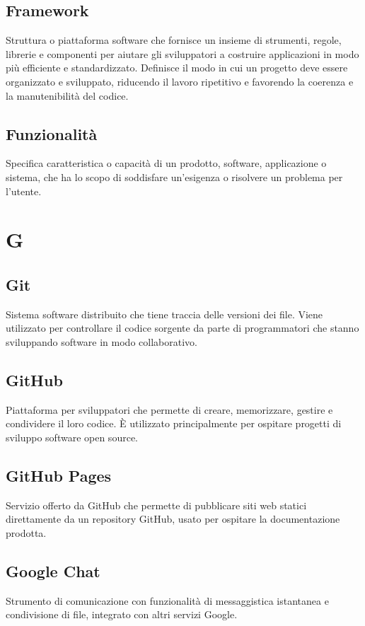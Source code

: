     \subsection{Framework}
    Struttura o piattaforma software che fornisce un insieme di strumenti, regole, 
    librerie e componenti per aiutare gli sviluppatori a costruire applicazioni 
    in modo più efficiente e standardizzato. Definisce il modo in cui un progetto 
    deve essere organizzato e sviluppato, riducendo il lavoro ripetitivo e favorendo 
    la coerenza e la manutenibilità del codice.
    \subsection{Funzionalità}
    \label{Funzionalità}
    Specifica caratteristica o capacità di un prodotto, software, applicazione o sistema, 
    che ha lo scopo di soddisfare un'esigenza o risolvere un problema per l'utente.
\pagebreak
\section{G}
    \subsection{Git}
    \label{Git}
    Sistema software distribuito che tiene traccia delle versioni dei file. 
    Viene utilizzato per controllare il codice sorgente da parte di programmatori 
    che stanno sviluppando software in modo collaborativo.
    \subsection{GitHub}
    \label{GitHub}
    Piattaforma per sviluppatori che permette di creare, memorizzare, gestire 
    e condividere il loro codice. È utilizzato principalmente per ospitare 
    progetti di sviluppo software open source.
    \subsection{GitHub Pages}
    \label{GitHub Pages}
    Servizio offerto da GitHub che permette di pubblicare siti web statici direttamente da un repository GitHub,
    usato per ospitare la documentazione prodotta.
    \subsection{Google Chat}
    Strumento di comunicazione con funzionalità di messaggistica
    istantanea e condivisione di file, integrato con altri servizi Google.
